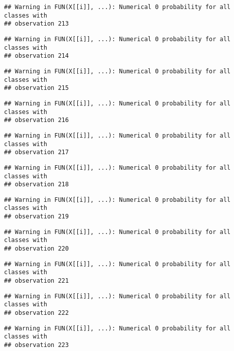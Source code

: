 \documentclass[
]{article}
\begin{document}
\begin{verbatim}
## Warning in FUN(X[[i]], ...): Numerical 0 probability for all classes with
## observation 213
\end{verbatim}

\begin{verbatim}
## Warning in FUN(X[[i]], ...): Numerical 0 probability for all classes with
## observation 214
\end{verbatim}

\begin{verbatim}
## Warning in FUN(X[[i]], ...): Numerical 0 probability for all classes with
## observation 215
\end{verbatim}

\begin{verbatim}
## Warning in FUN(X[[i]], ...): Numerical 0 probability for all classes with
## observation 216
\end{verbatim}

\begin{verbatim}
## Warning in FUN(X[[i]], ...): Numerical 0 probability for all classes with
## observation 217
\end{verbatim}

\begin{verbatim}
## Warning in FUN(X[[i]], ...): Numerical 0 probability for all classes with
## observation 218
\end{verbatim}

\begin{verbatim}
## Warning in FUN(X[[i]], ...): Numerical 0 probability for all classes with
## observation 219
\end{verbatim}

\begin{verbatim}
## Warning in FUN(X[[i]], ...): Numerical 0 probability for all classes with
## observation 220
\end{verbatim}

\begin{verbatim}
## Warning in FUN(X[[i]], ...): Numerical 0 probability for all classes with
## observation 221
\end{verbatim}

\begin{verbatim}
## Warning in FUN(X[[i]], ...): Numerical 0 probability for all classes with
## observation 222
\end{verbatim}

\begin{verbatim}
## Warning in FUN(X[[i]], ...): Numerical 0 probability for all classes with
## observation 223
\end{verbatim}
\end{document}
